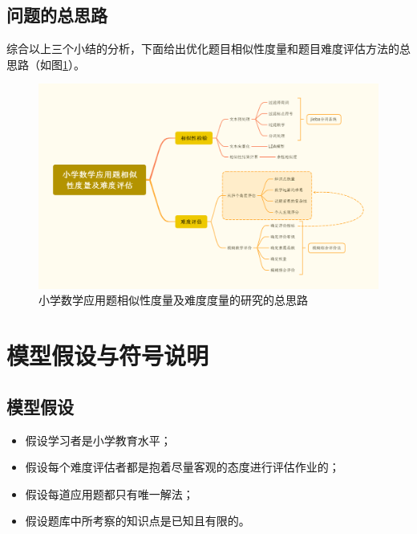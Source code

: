 \subsection{问题的总思路}

综合以上三个小结的分析，下面给出优化题目相似性度量和题目难度评估方法的总思路（如图\ref{figure042108}）。

\begin{figure}[h]
    \centering
    \includegraphics[scale=0.2]{res/figure042108.png}
    \caption{小学数学应用题相似性度量及难度度量的研究的总思路}
    \label{figure042108}
\end{figure}

%
%

\section{模型假设与符号说明}

\subsection{模型假设}

\begin{itemize}
    \item 假设学习者是小学教育水平；
    \item 假设每个难度评估者都是抱着尽量客观的态度进行评估作业的；
    \item 假设每道应用题都只有唯一解法；
    \item 假设题库中所考察的知识点是已知且有限的。
\end{itemize}

